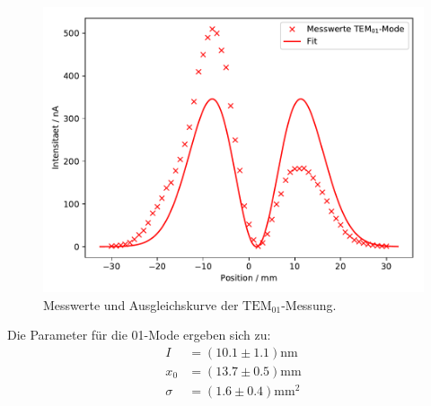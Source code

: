 \begin{figure}[H]
  \centering
  \includegraphics{plots/M01.pdf}
  \caption{Messwerte und Ausgleichskurve der $\text{TEM}_{01}$-Messung.}
  \label{fig:M01}
\end{figure}
Die Parameter für die 01-Mode ergeben sich zu:
\begin{align*}
  I &= (10.1\pm1.1)\text{nm}\\
  x_0&=(13.7\pm0.5) \text{mm}\\
  \sigma &= (1.6\pm0.4) \text{mm}^{2}
\end{align*}
